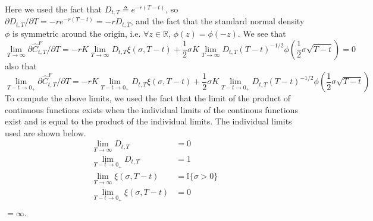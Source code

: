 \documentclass{article}
\numberwithin{equation}{section}
\begin{document}
Here we used the fact that $ D_{t, T} \triangleq e^{-r(T - t)} $, so
$ \partial D_{t, T} / \partial T = -re^{-r(T - t)} = -rD_{t, T} $, and the fact
that the standard normal density $ \phi $ is symmetric around the origin, i.e.
$ \forall z \in \mathbb{R} $, $ \phi(z) = \phi(-z) $. We see that
\begin{equation*}
    \lim_{T \rightarrow \infty} \partial\hat{C}_{t, T}^F / \partial T =
    -rK\lim_{T \rightarrow \infty}D_{t, T}\xi(\sigma, T - t) +
    \frac{1}{2}\sigma K\lim_{T \rightarrow \infty}D_{t, T}(T - t)^{-1 / 2}
    \phi\left(\frac{1}{2}\sigma\sqrt{T - t}\right) = 0
\end{equation*}
also that
\begin{equation*}
    \lim_{T - t \rightarrow 0_+} \partial\hat{C}_{t, T}^F / \partial T =
    -rK\lim_{T - t \rightarrow 0_+}D_{t, T}\xi(\sigma, T - t) +
    \frac{1}{2}\sigma K\lim_{T - t \rightarrow 0_+}D_{t, T}(T - t)^{-1 / 2}
    \phi\left(\frac{1}{2}\sigma\sqrt{T - t}\right)
\end{equation*}
To compute the above limits, we used the fact that the limit of the product of
continuous functions exists when the individual limits of the continous
functions exist and is equal to the product of the individual limits. The
individual limits used are shown below.
\begin{equation*}
    \begin{split}
        \lim_{T \rightarrow \infty}D_{t, T} & = 0 \\
        \lim_{T - t \rightarrow 0_+}D_{t, T} & = 1 \\
        \lim_{T \rightarrow \infty}\xi(\sigma, T - t) & =
        \mathbb{I}\{\sigma > 0\} \\
        \lim_{T - t \rightarrow 0_+}\xi(\sigma, T - t) & = 0 \\
    \end{split}
\end{equation*}
$
 = \infty
$\footnotemark\footnotetext{
    Since $ \lim_{T - t \rightarrow 0_+}D_{t, T} = 1 $ and
    $ \forall \sigma \in [0, \infty) $,
    $ \lim_{T - t \rightarrow 0_+}\xi(\sigma, T - t) = 0 $, then
    $ -\lim_{T - t \rightarrow 0_+}rKD_{t, T}\xi(\sigma, T - t) = 0 $.
}.
\end{document}
